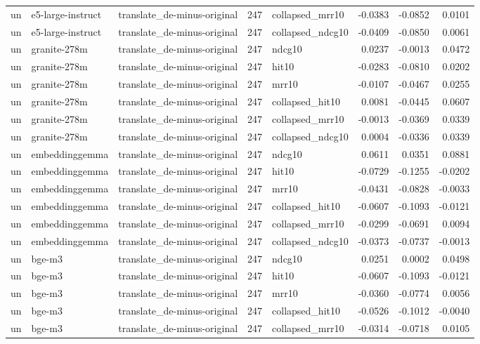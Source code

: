 \begin{tabular}{lllrlrrr}
un & e5-large-instruct & translate\_de-minus-original & 247 & collapsed\_mrr10 & -0.0383 & -0.0852 & 0.0101 \\
un & e5-large-instruct & translate\_de-minus-original & 247 & collapsed\_ndcg10 & -0.0409 & -0.0850 & 0.0061 \\
un & granite-278m & translate\_de-minus-original & 247 & ndcg10 & 0.0237 & -0.0013 & 0.0472 \\
un & granite-278m & translate\_de-minus-original & 247 & hit10 & -0.0283 & -0.0810 & 0.0202 \\
un & granite-278m & translate\_de-minus-original & 247 & mrr10 & -0.0107 & -0.0467 & 0.0255 \\
un & granite-278m & translate\_de-minus-original & 247 & collapsed\_hit10 & 0.0081 & -0.0445 & 0.0607 \\
un & granite-278m & translate\_de-minus-original & 247 & collapsed\_mrr10 & -0.0013 & -0.0369 & 0.0339 \\
un & granite-278m & translate\_de-minus-original & 247 & collapsed\_ndcg10 & 0.0004 & -0.0336 & 0.0339 \\
un & embeddinggemma & translate\_de-minus-original & 247 & ndcg10 & 0.0611 & 0.0351 & 0.0881 \\
un & embeddinggemma & translate\_de-minus-original & 247 & hit10 & -0.0729 & -0.1255 & -0.0202 \\
un & embeddinggemma & translate\_de-minus-original & 247 & mrr10 & -0.0431 & -0.0828 & -0.0033 \\
un & embeddinggemma & translate\_de-minus-original & 247 & collapsed\_hit10 & -0.0607 & -0.1093 & -0.0121 \\
un & embeddinggemma & translate\_de-minus-original & 247 & collapsed\_mrr10 & -0.0299 & -0.0691 & 0.0094 \\
un & embeddinggemma & translate\_de-minus-original & 247 & collapsed\_ndcg10 & -0.0373 & -0.0737 & -0.0013 \\
un & bge-m3 & translate\_de-minus-original & 247 & ndcg10 & 0.0251 & 0.0002 & 0.0498 \\
un & bge-m3 & translate\_de-minus-original & 247 & hit10 & -0.0607 & -0.1093 & -0.0121 \\
un & bge-m3 & translate\_de-minus-original & 247 & mrr10 & -0.0360 & -0.0774 & 0.0056 \\
un & bge-m3 & translate\_de-minus-original & 247 & collapsed\_hit10 & -0.0526 & -0.1012 & -0.0040 \\
un & bge-m3 & translate\_de-minus-original & 247 & collapsed\_mrr10 & -0.0314 & -0.0718 & 0.0105 \\

\end{tabular}
